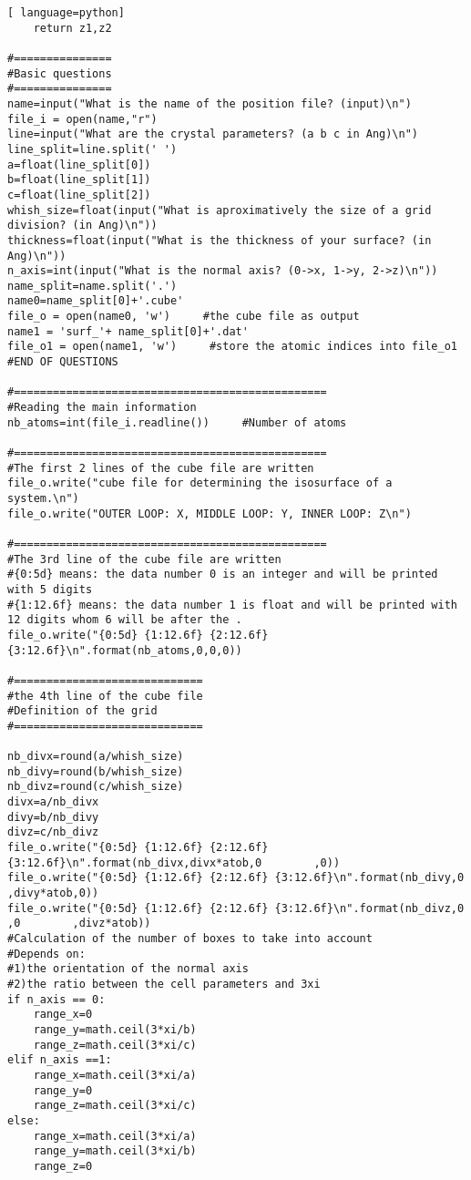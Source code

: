 \begin{lstlisting}[ language=python]
	return z1,z2

#===============
#Basic questions
#===============
name=input("What is the name of the position file? (input)\n")
file_i = open(name,"r")
line=input("What are the crystal parameters? (a b c in Ang)\n")
line_split=line.split(' ')
a=float(line_split[0])
b=float(line_split[1])
c=float(line_split[2])
whish_size=float(input("What is aproximatively the size of a grid division? (in Ang)\n"))
thickness=float(input("What is the thickness of your surface? (in Ang)\n"))
n_axis=int(input("What is the normal axis? (0->x, 1->y, 2->z)\n"))
name_split=name.split('.')
name0=name_split[0]+'.cube'
file_o = open(name0, 'w')     #the cube file as output
name1 = 'surf_'+ name_split[0]+'.dat' 
file_o1 = open(name1, 'w')     #store the atomic indices into file_o1
#END OF QUESTIONS

#================================================
#Reading the main information
nb_atoms=int(file_i.readline())     #Number of atoms

#================================================
#The first 2 lines of the cube file are written
file_o.write("cube file for determining the isosurface of a system.\n")
file_o.write("OUTER LOOP: X, MIDDLE LOOP: Y, INNER LOOP: Z\n")

#================================================
#The 3rd line of the cube file are written
#{0:5d} means: the data number 0 is an integer and will be printed with 5 digits
#{1:12.6f} means: the data number 1 is float and will be printed with 12 digits whom 6 will be after the .
file_o.write("{0:5d} {1:12.6f} {2:12.6f} {3:12.6f}\n".format(nb_atoms,0,0,0))

#=============================
#the 4th line of the cube file
#Definition of the grid
#=============================

nb_divx=round(a/whish_size) 
nb_divy=round(b/whish_size) 
nb_divz=round(c/whish_size) 
divx=a/nb_divx
divy=b/nb_divy
divz=c/nb_divz
file_o.write("{0:5d} {1:12.6f} {2:12.6f} {3:12.6f}\n".format(nb_divx,divx*atob,0        ,0))
file_o.write("{0:5d} {1:12.6f} {2:12.6f} {3:12.6f}\n".format(nb_divy,0        ,divy*atob,0))
file_o.write("{0:5d} {1:12.6f} {2:12.6f} {3:12.6f}\n".format(nb_divz,0        ,0        ,divz*atob))
#Calculation of the number of boxes to take into account
#Depends on:
#1)the orientation of the normal axis
#2)the ratio between the cell parameters and 3xi
if n_axis == 0:
	range_x=0
	range_y=math.ceil(3*xi/b)
	range_z=math.ceil(3*xi/c)
elif n_axis ==1:
	range_x=math.ceil(3*xi/a) 
	range_y=0
	range_z=math.ceil(3*xi/c)
else:
	range_x=math.ceil(3*xi/a)
	range_y=math.ceil(3*xi/b)
	range_z=0
	

\end{lstlisting}
